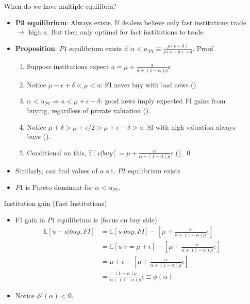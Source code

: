 \documentclass[english,10pt
,aspectratio=169
]{beamer}
\begin{document}
\begin{frame}{When do we have multiple equilibria?}
	\begin{itemize}
		\item \textbf{P3 equilibrium}: Always exists. If dealers believe only fast institutions trade $\rightarrow$  high $a$. But then only optimal for fast institutions to trade.
		\item \textbf{Proposition}: $P1$ equilibrium exists if $\alpha<\alpha_{P1} \equiv \frac{\rho(\epsilon-\delta)}{\rho(\epsilon-\delta)+\delta}$. Proof. 
		\begin{enumerate}
			\item Suppose institutions expect $a=\mu + \frac{\alpha}{\alpha+(1-\alpha)\rho} \epsilon$ 
			\item Notice $\mu-\epsilon+\delta<\mu<a$: FI never buy with bad news ()
			\item $\alpha<\alpha_{P1} \Rightarrow a<\mu+\epsilon-\delta$: good news imply expected FI gains from buying, regardless of private valuation
			().
			\item Notice $\mu+\delta>\mu+\epsilon/2>\mu+\epsilon-\delta >a$: SI with high valuation always buys ().
			\item Conditional on this, $\mathbb{E}[v|buy]=\mu + \frac{\alpha}{\alpha+(1-\alpha)\rho} \epsilon$ (). \qed
		\end{enumerate}
		\item Similarly, can find values of $\alpha$ s.t. $P2$ equilibrium exists
		\item $P1$ is Pareto dominant for $\alpha<\alpha_{P1}$. 
	\end{itemize}
\end{frame}


\begin{frame}{Institution gain (Fast Institutions)}
	\begin{itemize}
		\item FI gain in $P1$ equilibrium is (focus on buy side):
		\begin{align*}
		\mathbb{E}[u-a|buy, FI]
		& = \mathbb{E}[u|buy, FI] - \left[\mu + \frac{\alpha}{\alpha+(1-\alpha)\rho} \epsilon\right] \\
		& = \mathbb{E}[u|v=\mu+\epsilon] - \left[\mu + \frac{\alpha}{\alpha+(1-\alpha)\rho} \epsilon\right] \\
		& = \mu+\epsilon - \left[\mu + \frac{\alpha}{\alpha+(1-\alpha)\rho} \epsilon\right] \\
		& = \frac{(1-\alpha)\rho}{\alpha+(1-\alpha)\rho} \epsilon \equiv \phi(\alpha)
		\end{align*}
		\item Notice $\phi'(\alpha)<0$.
	\end{itemize}
\end{frame}
\end{document}

